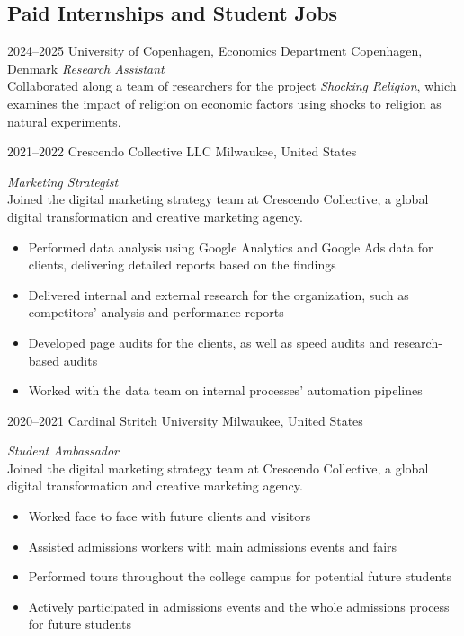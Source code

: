 \documentclass[]{friggeri-cv-a4}
\begin{document}
\subsection{Paid Internships and Student Jobs}

\begin{entrylist}

\entry
{2024--2025}
{University of Copenhagen, Economics Department}
{Copenhagen, Denmark}
{\emph{Research Assistant} \\
Collaborated along a team of researchers for the project \emph{Shocking Religion}, which examines the impact of religion on economic factors using shocks to religion as natural experiments. \\}


\entry
{2021--2022}
{Crescendo Collective LLC}
{Milwaukee, United States}
{\emph{Marketing Strategist} \\
Joined the digital marketing strategy team at Crescendo Collective, a global digital transformation and creative marketing agency.\\
\begin{itemize}
\item Performed data analysis using Google Analytics and Google Ads data for clients, delivering detailed reports based on the findings
\item Delivered internal and external research for the organization, such as competitors’ analysis and performance reports
\item Developed page audits for the clients, as well as speed audits and research-based audits
\item Worked with the data team on internal processes' automation pipelines
\end{itemize}}


\entry
{2020--2021}
{Cardinal Stritch University}
{Milwaukee, United States}
{\emph{Student Ambassador} \\
Joined the digital marketing strategy team at Crescendo Collective, a global digital transformation and creative marketing agency.\\
\begin{itemize}
\item Worked face to face with future clients and visitors
\item Assisted admissions workers with main admissions events and fairs
\item Performed tours throughout the college campus for potential future students
\item Actively participated in admissions events and the whole admissions process for future students
\end{itemize}}


\end{entrylist}
\end{document}
